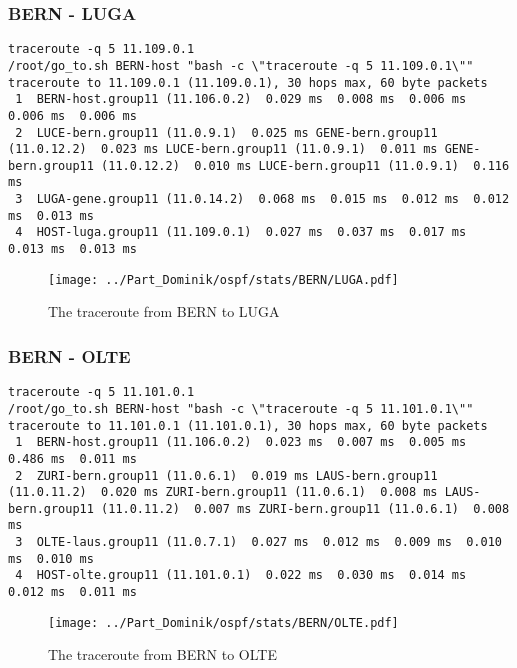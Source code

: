 \subsubsection{BERN - LUGA}
\begin{lstlisting}
traceroute -q 5 11.109.0.1
/root/go_to.sh BERN-host "bash -c \"traceroute -q 5 11.109.0.1\""
traceroute to 11.109.0.1 (11.109.0.1), 30 hops max, 60 byte packets
 1  BERN-host.group11 (11.106.0.2)  0.029 ms  0.008 ms  0.006 ms  0.006 ms  0.006 ms
 2  LUCE-bern.group11 (11.0.9.1)  0.025 ms GENE-bern.group11 (11.0.12.2)  0.023 ms LUCE-bern.group11 (11.0.9.1)  0.011 ms GENE-bern.group11 (11.0.12.2)  0.010 ms LUCE-bern.group11 (11.0.9.1)  0.116 ms
 3  LUGA-gene.group11 (11.0.14.2)  0.068 ms  0.015 ms  0.012 ms  0.012 ms  0.013 ms
 4  HOST-luga.group11 (11.109.0.1)  0.027 ms  0.037 ms  0.017 ms  0.013 ms  0.013 ms
\end{lstlisting}
\begin{figure}[H]
\centering
\texttt{[image: ../Part\_Dominik/ospf/stats/BERN/LUGA.pdf]}
\caption{The traceroute from BERN to LUGA}
\end{figure}
\clearpage
\subsubsection{BERN - OLTE}
\begin{lstlisting}
traceroute -q 5 11.101.0.1
/root/go_to.sh BERN-host "bash -c \"traceroute -q 5 11.101.0.1\""
traceroute to 11.101.0.1 (11.101.0.1), 30 hops max, 60 byte packets
 1  BERN-host.group11 (11.106.0.2)  0.023 ms  0.007 ms  0.005 ms  0.486 ms  0.011 ms
 2  ZURI-bern.group11 (11.0.6.1)  0.019 ms LAUS-bern.group11 (11.0.11.2)  0.020 ms ZURI-bern.group11 (11.0.6.1)  0.008 ms LAUS-bern.group11 (11.0.11.2)  0.007 ms ZURI-bern.group11 (11.0.6.1)  0.008 ms
 3  OLTE-laus.group11 (11.0.7.1)  0.027 ms  0.012 ms  0.009 ms  0.010 ms  0.010 ms
 4  HOST-olte.group11 (11.101.0.1)  0.022 ms  0.030 ms  0.014 ms  0.012 ms  0.011 ms
\end{lstlisting}
\begin{figure}[H]
\centering
\texttt{[image: ../Part\_Dominik/ospf/stats/BERN/OLTE.pdf]}
\caption{The traceroute from BERN to OLTE}
\end{figure}
\clearpage
